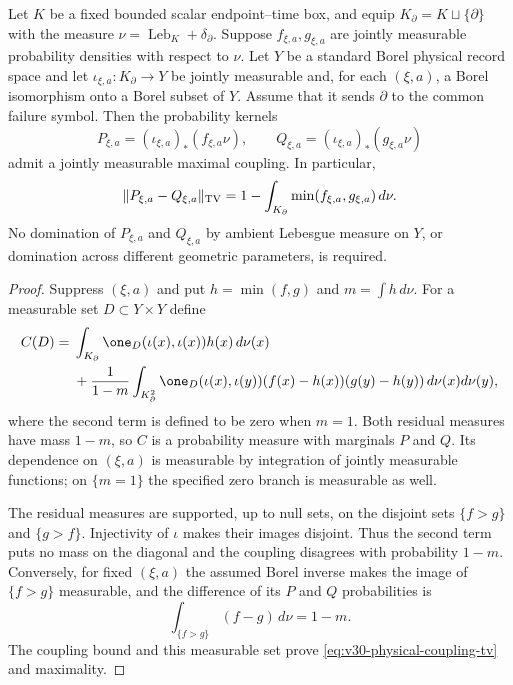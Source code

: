 \begin{lemma}
\label{lem:v30-physical-coupling}
Let $K$ be a fixed bounded scalar endpoint--time box, and equip
$K_\partial=K\sqcup\{\partial\}$ with the measure
$\nu=\operatorname{Leb}_K+\delta_\partial$.  Suppose
$f_{\xi,a},g_{\xi,a}$ are jointly measurable probability densities with
respect to $\nu$.  Let $Y$ be a standard Borel physical record space and
let $\iota_{\xi,a}:K_\partial\to Y$ be jointly measurable and, for
each $(\xi,a)$, a Borel isomorphism onto a Borel subset of $Y$.
Assume that it sends $\partial$ to the common failure symbol.
Then the probability kernels
\[
 P_{\xi,a}=(\iota_{\xi,a})_*(f_{\xi,a}\nu),\qquad
 Q_{\xi,a}=(\iota_{\xi,a})_*(g_{\xi,a}\nu)
\]
admit a jointly measurable maximal coupling.  In particular,
\begin{equation}\label{eq:v30-physical-coupling-tv}
 \|P_{\xi,a}-Q_{\xi,a}\|_{\rm TV}
   =1-\int_{K_\partial}\min(f_{\xi,a},g_{\xi,a})\,d\nu.
\end{equation}
No domination of $P_{\xi,a}$ and $Q_{\xi,a}$ by ambient Lebesgue measure
on $Y$, or domination across different geometric parameters, is required.
\end{lemma}

\begin{proof}
Suppress $(\xi,a)$ and put $h=\min(f,g)$ and $m=\int h\,d\nu$.
For a measurable set $D\subset Y\times Y$ define
\begin{align*}
 C(D)={}&\int_{K_\partial}
       \one_D(\iota(x),\iota(x))h(x)\,d\nu(x)\\
 &+\frac1{1-m}\int_{K_\partial^2}
       \one_D(\iota(x),\iota(y))
       (f(x)-h(x))(g(y)-h(y))\,d\nu(x)d\nu(y),
\end{align*}
where the second term is defined to be zero when $m=1$.
Both residual measures have mass $1-m$, so $C$ is a probability measure
with marginals $P$ and $Q$.  Its dependence on $(\xi,a)$ is measurable
by integration of jointly measurable functions; on $\{m=1\}$ the
specified zero branch is measurable as well.

The residual measures are supported, up to null sets, on the disjoint
sets $\{f>g\}$ and $\{g>f\}$.  Injectivity of $\iota$ makes their images
disjoint.  Thus the second term puts no mass on the diagonal and the
coupling disagrees with probability $1-m$.  Conversely, for fixed $(\xi,a)$ the assumed Borel inverse makes the
image of $\{f>g\}$ measurable,
and the difference of its $P$ and $Q$ probabilities is
\[
 \int_{\{f>g\}}(f-g)\,d\nu=1-m.
\]
The coupling bound and this measurable set prove
\eqref{eq:v30-physical-coupling-tv} and maximality.
\end{proof}

